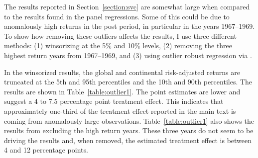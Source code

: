 \documentclass[12pt]{article}
\numberwithin{equation}{section}
\begin{document}
The results reported in Section~\ref{section:svc} are somewhat large when compared to the results found in the panel regressions. Some of this could be due to anomalously high returns in the post period, in particular in the years 1967--1969. To show how removing these outliers affects the results, I use three different methods: (1) winsorizing at the 5\% and 10\% levels, (2) removing the three highest return years from 1967--1969, and (3) using outlier robust regression via \cite{Li2006}.

In the winsorized results,  the global and continental risk-adjusted returns are truncated at the 5th and 95th percentiles and the 10th and 90th percentiles. The results are shown in Table~\ref{table:outlier1}. The point estimates are lower and suggest a 4 to 7.5 percentage point treatment effect. This indicates that approximately one-third of the treatment effect reported in the main text is coming from anomalously large observations. Table~\ref{table:outlier1} also shows the results from excluding the high return years. These three years do not seem to be driving the results and, when removed, the estimated treatment effect is between 4 and 12 percentage points.
\end{document}
